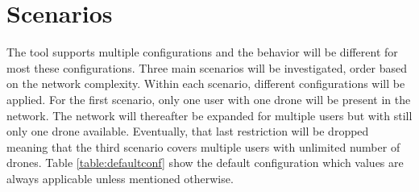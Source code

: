 \chapter{Scenarios}
\label{chap:scenarios}
The tool supports multiple configurations and the behavior will be different for most these configurations. Three main scenarios 
will be investigated, order based on the network complexity. Within each scenario, different configurations will be applied.
For the first scenario, only one user with one drone will be present in the network. The network will thereafter be expanded
for multiple users but with still only one drone available. Eventually, that last restriction will be dropped meaning 
that the third scenario covers multiple users with unlimited number of drones. 
Table \ref{table:defaultconf} show the default configuration which values are always applicable unless mentioned otherwise.

